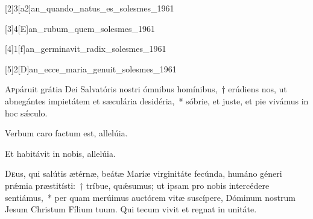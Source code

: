 \documentclass[vesperale_romanum.tex]{subfiles}
\begin{document}



[2]{3}[a2]{an_quando_natus_es_solesmes_1961}



[3]{4}[E]{an_rubum_quem_solesmes_1961}


[4]{1}[f]{an_germinavit_radix_solesmes_1961}


[5]{2}[D]{an_ecce_maria_genuit_solesmes_1961}





\lettrine{A}{p}páruit grátia Dei Salvatóris nostri ómnibus homínibus,~† erúdiens nos, ut abnegántes impietátem et sæculária desidéria,~* sóbrie, et juste, et pie vivámus in hoc sǽculo.


\vv Verbum caro factum est, allelúia.

\rr Et habitávit in nobis, allelúia.


 \label{or_jan_1}
 
\oratio

\lettrine{D}{e}us, qui salútis ætérnæ, beátæ Maríæ virginitáte fecúnda, humáno géneri prǽmia præstitísti:~† tríbue, quǽsumus; ut ipsam pro nobis intercédere sentiámus,~* per quam merúimus auctórem vitæ suscípere, Dóminum nostrum Jesum Christum Fílium tuum.
Qui tecum vivit et regnat in unitáte.
\end{document}
